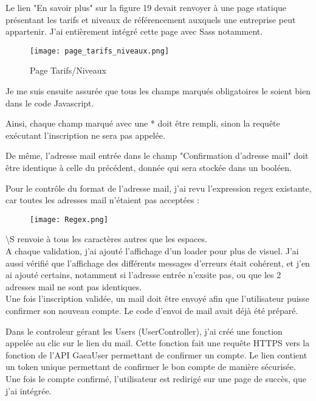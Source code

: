 Le lien "En savoir plus" sur la figure 19 devait renvoyer à une page statique présentant les tarifs et niveaux de référencement auxquels une entreprise peut appartenir. J'ai entièrement intégré cette page avec Sass notamment.

\begin{figure}[H]
    \texttt{[image: page\_tarifs\_niveaux.png]}
    \caption{Page Tarifs/Niveaux}
\end{figure}

Je me suis ensuite assurée que tous les champs marqués obligatoires le soient bien dans le code Javascript. 

Ainsi, chaque champ marqué avec une * doit être rempli, sinon la requête exécutant l'inscription ne sera pas appelée.

De même, l'adresse mail entrée dans le champ "Confirmation d'adresse mail" doit être identique à celle du précédent, donnée qui sera stockée dans un booléen.

Pour le contrôle du format de l'adresse mail, j'ai revu l'expression regex existante, car toutes les adresses mail n'étaient pas acceptées :

\begin{figure}[H]
    \texttt{[image: Regex.png]}
\end{figure}

\textbackslash S renvoie à tous les caractères autres que les espaces.\\

A chaque validation, j'ai ajouté l'affichage d'un loader pour plus de visuel. J'ai aussi vérifié que l'affichage des différents messages d'erreurs était cohérent, et j'en ai ajouté certains, notamment si l'adresse entrée n'exsite pas, ou que les 2 adresses mail ne sont pas identiques.\\

Une fois l'inscription validée, un mail doit être envoyé afin que l'utilisateur puisse confirmer son nouveau compte. Le code d'envoi de mail avait déjà été préparé.

Dans le controleur gérant les Users (UserController), j'ai créé une fonction appelée au clic sur le lien du mail.
Cette fonction fait une requête HTTPS vers la fonction de l'API GaeaUser permettant de confirmer un compte. Le lien contient un token unique permettant de confirmer le bon compte de manière sécurisée.
Une fois le compte confirmé, l'utilisateur est redirigé sur une page de succès, que j'ai intégrée.

